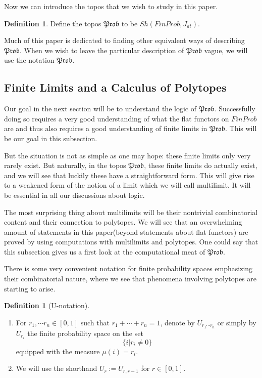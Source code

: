\documentclass[a4paper]{amsproc}
\theoremstyle{plain}
\theoremstyle{definition}
\newtheorem{definition}[theorem]{Definition}
\theoremstyle{remark}
\numberwithin{equation}{section}
\begin{document}
Now we can introduce the topos that we wish to study in this paper.

\begin{definition}
Define the topos $\mathfrak{Prob}$ to be $Sh(FinProb, J_{at})$.
\end{definition}

Much of this paper is dedicated to finding other equivalent ways of describing $\mathfrak{Prob}$. When we wish to leave the particular description of $\mathfrak{Prob}$ vague, we will use the notation $\mathfrak{Prob}$.

\subsection{Finite Limits and a Calculus of Polytopes}

Our goal in the next section will be to understand the logic of $\mathfrak{Prob}$. Successfully doing so requires a very good understanding of what the flat functors on $FinProb$ are and thus also requires a good understanding of finite limits in $\mathfrak{Prob}$. This will be our goal in this subsection.

But the situation is not as simple as one may hope: these finite limits only very rarely exist. But naturally, in the topos $\mathfrak{Prob}$, these finite limits do actually exist, and we will see that luckily these have a straightforward form. This will give rise to a weakened form of the notion of a limit which we will call multilimit. It will be essential in all our discussions about logic.

The most surprising thing about multilimits will be their nontrivial combinatorial content and their connection to polytopes. We will see that an overwhelming amount of statements in this paper(beyond statements about flat functors) are proved by using computations with multilimits and polytopes. One could say that this subsection gives us a first look at the computational meat of $\mathfrak{Prob}$.

There is some very convenient notation for finite probability spaces emphasizing their combinatorial nature, where we see that phenomena involving polytopes are starting to arise.

\begin{definition}[U-notation] \label{U-notation}
\begin{enumerate}
\item For $r_1, \cdots r_n \in [0,1]$ such that $r_1 + \cdots + r_n = 1$, denote by $U_{r_1 \cdots r_n}$ or simply by $U_{r_i}$ the finite probability space on the set 
\[
\{i | r_i \neq 0 \}
\]
equipped with the measure $\mu(i) = r_i$.
\item We will use the shorthand $U_r := U_{r,r-1}$ for $r \in [0,1]$.
\end{enumerate}
\end{definition}
\end{document}

